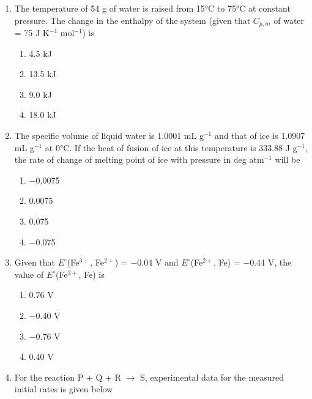 \documentclass[journal,12pt,onecolumn]{IEEEtran}
\theoremstyle{remark}
\begin{document}
\begin{enumerate}
\item  The temperature of 54 g of water is raised from 15°C to 75°C at constant pressure. The change in the enthalpy of the system (given that $C_{p,m}$ of water = 75 J K$^{-1}$ mol$^{-1}$) is \hfill{}

\begin{multicols}{2}
\begin{enumerate}[label={}, leftmargin=*, itemsep=0pt]
 \item   4.5 kJ
 \item   13.5 kJ
 \item   9.0 kJ
 \item   18.0 kJ
\end{enumerate}
\end{multicols}
  

\item  The specific volume of liquid water is 1.0001 mL g$^{-1}$ and that of ice is 1.0907 mL g$^{-1}$ at 0°C. If the heat of fusion of ice at this temperature is 333.88 J g$^{-1}$, the rate of change of melting point of ice with pressure in deg atm$^{-1}$ will be \hfill{}

\begin{multicols}{2}
\begin{enumerate}[label={}, leftmargin=*, itemsep=0pt]
 \item   $-$0.0075
 \item   0.0075
 \item   0.075
 \item   $-$0.075
\end{enumerate}
\end{multicols}
  

\item  Given that $E^\circ$(Fe$^{3+}$, Fe$^{2+}$) = $-$0.04 V and $E^\circ$(Fe$^{2+}$, Fe) = $-$0.44 V, the value of $E^\circ$(Fe$^{3+}$, Fe) is \hfill{}

\begin{multicols}{2}
\begin{enumerate}[label={}, leftmargin=*, itemsep=0pt]
 \item   0.76 V
 \item   $-$0.40 V
 \item   $-$0.76 V
 \item   0.40 V
\end{enumerate}
\end{multicols}
  

\item  For the reaction P + Q + R $\rightarrow$ S, experimental data for the measured initial rates is given below \hfill{}


\end{enumerate}
\end{document}

